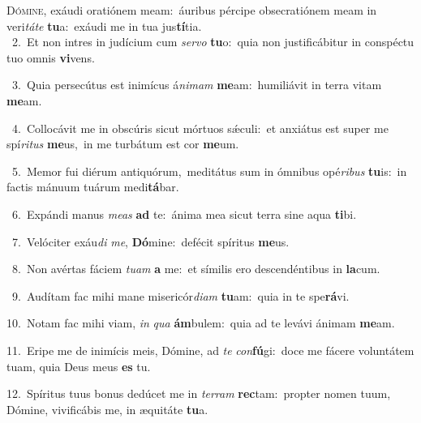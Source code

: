 \lettrine{\initial\textcolor{\initialcolor}{D}}{ómine,} exáudi oratiónem meam:~\dagger áuribus pércipe obsecratiónem meam in veri\-\textit{tá}\-\textit{te} \textbf{tu}\-a:~\star exáudi me in tua jus\-\textbf{tí}\-tia.\\
{\numbfont\textcolor{\numbcolor}{~2.}}~Et non intres in judícium cum \textit{ser}\-\textit{vo} \textbf{tu}\-o:~\star quia non justificábitur in conspéctu tuo omnis \textbf{vi}\-vens.\par
{\numbfont\textcolor{\numbcolor}{~3.}}~Quia persecútus est inimícus á\-\textit{ni}\-\textit{mam} \textbf{me}\-am:~\star humiliávit in terra vitam \textbf{me}\-am.\par
{\numbfont\textcolor{\numbcolor}{~4.}}~Collocávit me in obscúris sicut mórtuos sǽculi:~\dagger et anxiátus est super me spí\-\textit{ri}\-\textit{tus} \textbf{me}\-us,~\star in me turbátum est cor \textbf{me}\-um.\par
{\numbfont\textcolor{\numbcolor}{~5.}}~Memor fui diérum antiquórum,~\dagger meditátus sum in ómnibus opé\-\textit{ri}\-\textit{bus} \textbf{tu}\-is:~\star in factis mánuum tuárum medi\-\textbf{tá}\-bar.\par
{\numbfont\textcolor{\numbcolor}{~6.}}~Expándi manus \textit{me}\-\textit{as} \textbf{ad} te:~\star ánima mea sicut terra sine aqua \textbf{ti}\-bi.\par
{\numbfont\textcolor{\numbcolor}{~7.}}~Velóciter exáu\textit{di} \textit{me}\-, \textbf{Dó}\-mine:~\star defécit spíritus \textbf{me}\-us.\par
{\numbfont\textcolor{\numbcolor}{~8.}}~Non avértas fáciem \textit{tu}\-\textit{am} \textbf{a} me:~\star et símilis ero descendéntibus in \textbf{la}\-cum.\par
{\numbfont\textcolor{\numbcolor}{~9.}}~Audítam fac mihi mane misericór\-\textit{di}\-\textit{am} \textbf{tu}\-am:~\star quia in te spe\-\textbf{rá}\-vi.\par
{\numbfont\textcolor{\numbcolor}{10.}}~Notam fac mihi viam, \textit{in} \textit{qua} \textbf{ám}\-bulem:~\star quia ad te levávi ánimam \textbf{me}\-am.\par
{\numbfont\textcolor{\numbcolor}{11.}}~Eripe me de inimícis meis, Dómine, ad \textit{te} \textit{con}\-\textbf{fú}gi:~\star doce me fácere voluntátem tuam, quia Deus meus \textbf{es} tu.\par
{\numbfont\textcolor{\numbcolor}{12.}}~Spíritus tuus bonus dedúcet me in \textit{ter}\-\textit{ram} \textbf{rec}\-tam:~\star propter nomen tuum, Dómine, vivificábis me, in æquitáte \textbf{tu}\-a.\par
